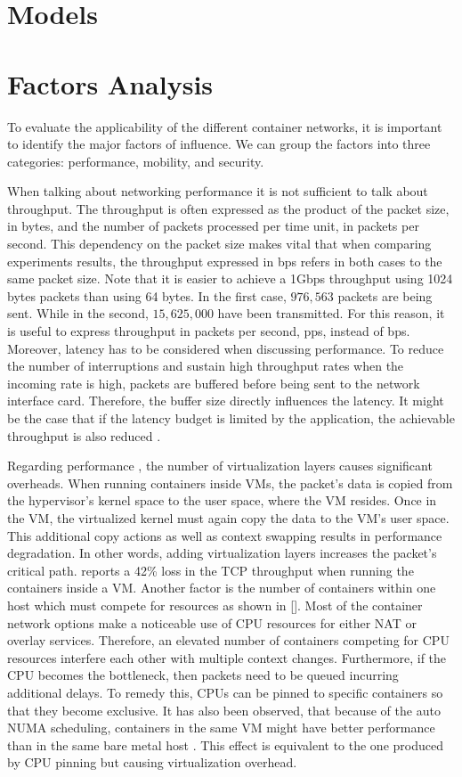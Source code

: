 \documentclass[conference]{IEEEtran}
\begin{document}
\section{Models}

\section{Factors Analysis}

To evaluate the applicability of the different container networks, it is important to identify the major factors of influence. We can group the factors into three categories: performance, mobility, and security.

When talking about networking performance it is not sufficient to talk about throughput. The throughput is often expressed as the product of the packet size, in bytes, and the number of packets processed per time unit, in packets per second. This dependency on the packet size makes vital that when comparing experiments results, the throughput expressed in bps refers in both cases to the same packet size. Note that it is easier to achieve a 1Gbps throughput using 1024 bytes packets than using 64 bytes. In the first case, $976,563$ packets are being sent. While in the second, $15,625,000$ have been transmitted. For this reason, it is useful to express throughput in packets per second, pps, instead of bps. Moreover, latency has to be considered when discussing performance. To reduce the number of interruptions and sustain high throughput rates when the incoming rate is high,  packets are buffered before being sent to the network interface card. Therefore, the buffer size directly influences the latency. It might be the case that if the latency budget is limited by the application, the achievable throughput is also reduced \cite{DEBS_20:Stylianopoulos}.

Regarding performance , the number of virtualization layers causes significant overheads. When running containers inside VMs, the packet's data is copied from the hypervisor’s kernel space to the user space, where the VM resides. Once in the VM, the virtualized kernel must again copy the data to the VM’s user space. This additional copy actions as well as context swapping results in performance degradation. In other words, adding virtualization layers increases the packet's critical path. \cite{IEEE_INFOCOM_2018:K. Suo} reports a 42\% loss in the TCP throughput when running the containers inside a VM.
Another factor is the number of containers within one host which must compete for resources as shown in []. Most of the container network options make a noticeable use of CPU resources for either NAT or overlay services. Therefore, an elevated number of containers competing for CPU resources interfere each other with multiple context changes. Furthermore, if the CPU becomes the bottleneck, then packets need to be queued incurring additional delays. To remedy this, CPUs can be pinned to specific containers so that they become exclusive. It has also been observed, that because of the auto NUMA scheduling, containers in the same VM might have better performance than in the same bare metal host \cite{HotConNet_17:Zhao}. This effect is equivalent to the one produced by CPU pinning but causing virtualization overhead.
\end{document}
